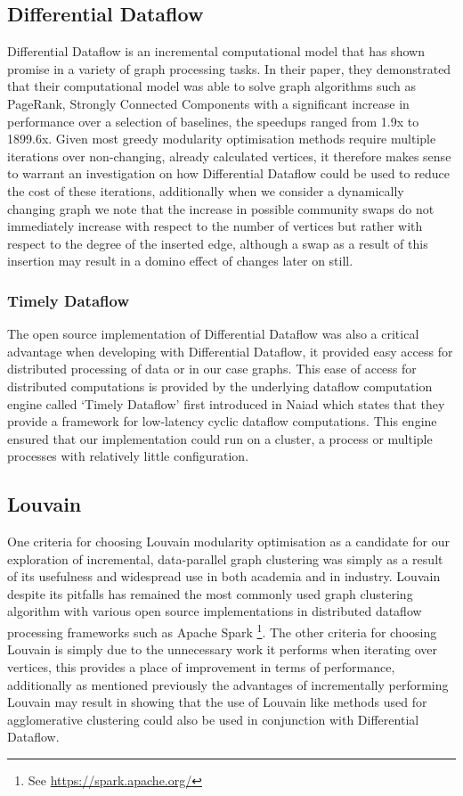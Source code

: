 \subsection{Differential Dataflow}
Differential Dataflow \cite{mcsherry2013differential} is an incremental computational model that has shown promise in a variety of graph processing tasks. In their paper, they demonstrated that their computational model was able to solve graph algorithms such as PageRank, Strongly Connected Components with a significant increase in performance over a selection of baselines, the speedups ranged from 1.9x to 1899.6x. Given most greedy modularity optimisation methods require multiple iterations over non-changing, already calculated vertices, it therefore makes sense to warrant an investigation on how Differential Dataflow could be used to reduce the cost of these iterations, additionally when we consider a dynamically changing graph we note that the increase in possible community swaps do not immediately increase with respect to the number of vertices but rather with respect to the degree of the inserted edge, although a swap as a result of this insertion may result in a domino effect of changes later on still. 

\subsubsection{Timely Dataflow}
The open source implementation of Differential Dataflow was also a critical advantage when developing with Differential Dataflow, it provided easy access for distributed processing of data or in our case graphs. This ease of access for distributed computations is provided by the underlying dataflow computation engine called `Timely Dataflow' first introduced in Naiad \cite{murray2013naiad} which states that they provide a framework for low-latency cyclic dataflow computations. This engine ensured that our implementation could run on a cluster, a process or multiple processes with relatively little configuration.

\subsection{Louvain}
One criteria for choosing Louvain modularity optimisation as a candidate for our exploration of incremental, data-parallel graph clustering was simply as a result of its usefulness and widespread use in both academia and in industry. Louvain despite its pitfalls has remained the most commonly used graph clustering algorithm with various open source implementations in distributed dataflow processing frameworks such as Apache Spark \footnote{See \url{https://spark.apache.org/}}. The other criteria for choosing Louvain is simply due to the unnecessary work it performs when iterating over vertices, this provides a place of improvement in terms of performance, additionally as mentioned previously the advantages of incrementally performing Louvain may result in showing that the use of Louvain like methods used for agglomerative clustering could also be used in conjunction with Differential Dataflow. 